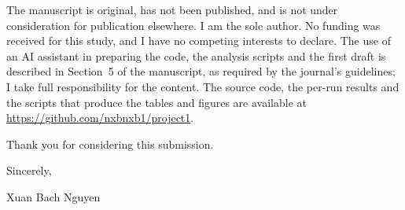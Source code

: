 \documentclass[11pt,a4paper]{article}
\begin{document}
The manuscript is original, has not been published, and is not under consideration for publication elsewhere. I am
the sole author. No funding was received for this study, and I have no competing interests to declare. The use of an
AI assistant in preparing the code, the analysis scripts and the first draft is described in Section~5 of the
manuscript, as required by the journal's guidelines; I take full responsibility for the content. The source code,
the per-run results and the scripts that produce the tables and figures are available at
\url{https://github.com/nxbnxb1/project1}.

Thank you for considering this submission.

\medskip
Sincerely,

\medskip
Xuan Bach Nguyen
\end{document}
